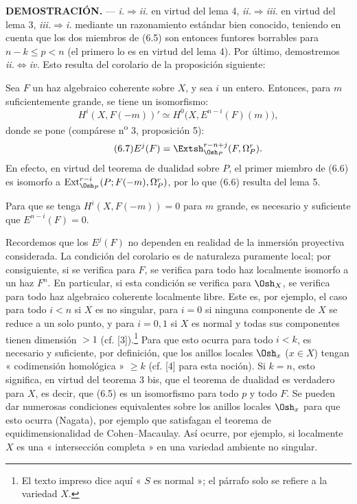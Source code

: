 \noindent\textbf{DEMOSTRACIÓN.} --- \textit{i.}$\Rightarrow$\textit{ii.} en
virtud del lema 4, \textit{ii.}$\Rightarrow$\textit{iii.} en virtud del lema 3,
\textit{iii.}$\Rightarrow$\textit{i.} mediante un razonamiento estándar bien conocido,
teniendo en cuenta que los dos miembros de (6.5) son entonces funtores borrables
para $n-k\leq p<n$ (el primero lo es en virtud del lema 4). Por último, demostremos
\textit{ii.}$\Leftrightarrow$\textit{iv.} Esto resulta del corolario de la
proposición siguiente:

 Sea $F$ un haz algebraico coherente sobre $X$, y
sea $i$ un entero. Entonces, para $m$ suficientemente grande, se tiene un isomorfismo:
\begin{equation}\tag{6.6}
  H^{i}(X,F(-m))'
  \simeq H^{0}\bigl(X,E^{n-i}(F)(m)\bigr),
\end{equation}
donde se pone (compárese n\textsuperscript{o} 3, proposición 5):
\begin{equation}\tag{6.7}
  E^{j}(F)=\Extsh_{\Osh_P}^{r-n+j}(F,\Omega_P^{r}).
\end{equation}
En efecto, en virtud del teorema de dualidad sobre $P$, el primer miembro de (6.6)
es isomorfo a
$\operatorname{Ext}_{\Osh_P}^{r-i}(P;F(-m),\Omega_P^{r})$, por lo que (6.6) resulta
del lema 5.

 Para que se tenga $H^{i}(X,F(-m))=0$ para $m$ grande, es
necesario y suficiente que $E^{n-i}(F)=0$.

Recordemos que los $E^{j}(F)$ no dependen en realidad de la inmersión proyectiva
considerada. La condición del corolario es de naturaleza puramente local; por consiguiente,
si se verifica para $F$, se verifica para todo haz localmente
isomorfo a un haz $F^{n}$. En particular, si esta condición se verifica
para $\Osh_X$, se verifica para todo haz algebraico coherente localmente
libre. Este es, por ejemplo, el caso para todo $i<n$ si $X$ es no singular, para
$i=0$ si ninguna componente de $X$ se reduce a un solo punto, y para $i=0,1$
si $X$ es normal y todas sus componentes tienen dimensión $>1$ (cf.
[3]).\footnote{El texto impreso dice aquí « $S$ es normal »; el párrafo
solo se refiere a la variedad $X$.} Para que esto ocurra para todo
$i<k$, es necesario y suficiente, por definición, que los anillos locales
$\Osh_x$ ($x\in X$) tengan « codimensión homológica » $\geq k$ (cf. [4]
para esta noción). Si $k=n$, esto significa, en virtud del teorema 3 bis, que el
teorema de dualidad es verdadero para $X$, es decir, que (6.5) es un isomorfismo para
todo $p$ y todo $F$. Se pueden dar numerosas condiciones equivalentes sobre
los anillos locales $\Osh_x$ para que esto ocurra (Nagata), por ejemplo que
satisfagan el teorema de equidimensionalidad de Cohen--Macaulay. Así ocurre,
por ejemplo, si localmente $X$ es una « intersección completa » en una
variedad ambiente no singular.

